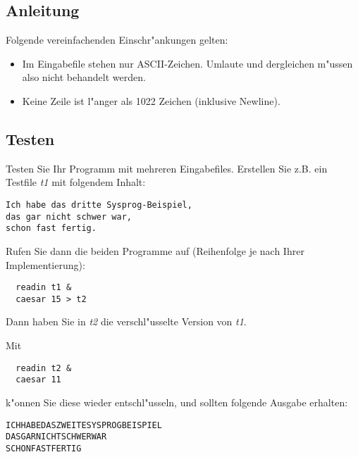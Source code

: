 \subsection*{Anleitung}
Folgende vereinfachenden Einschr"ankungen gelten:
\begin{itemize}
\item Im Eingabefile stehen nur ASCII-Zeichen. Umlaute und dergleichen
m"ussen also nicht behandelt werden.
\item Keine Zeile ist l"anger als 1022 Zeichen (inklusive Newline).
\end{itemize}




\subsection*{Testen}
Testen Sie Ihr Programm mit mehreren Eingabefiles. 
Erstellen Sie z.B. ein Testfile \emph{t1} mit folgendem Inhalt: 
\begin{verbatim}
Ich habe das dritte Sysprog-Beispiel,
das gar nicht schwer war,
schon fast fertig.
\end{verbatim}
Rufen Sie dann die beiden Programme auf (Reihenfolge je nach Ihrer
Implementierung):
\begin{verbatim}
  readin t1 &
  caesar 15 > t2
\end{verbatim}
Dann haben Sie in \emph{t2} die verschl"usselte Version von \emph{t1}.

Mit
\begin{verbatim}
  readin t2 &
  caesar 11
\end{verbatim}
k"onnen Sie diese wieder entschl"usseln, und sollten folgende Ausgabe
erhalten:
\begin{verbatim}
ICHHABEDASZWEITESYSPROGBEISPIEL
DASGARNICHTSCHWERWAR
SCHONFASTFERTIG
\end{verbatim}

\osueguidelinesthree


